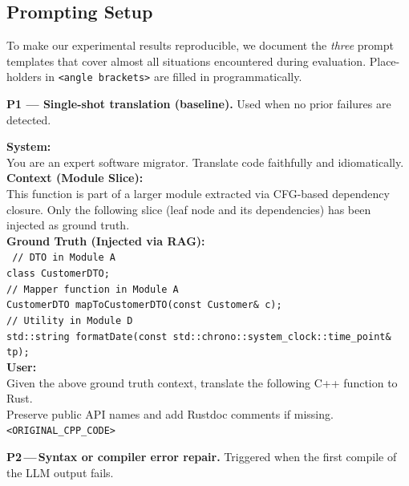 \documentclass[twocolumn]{article}
\begin{document}
    \subsection{Prompting Setup}
    \label{subsec:prompts}
    
    To make our experimental results reproducible, we document the
    \emph{three} prompt templates that cover almost all situations
    encountered during evaluation.  Place-holders in
    \texttt{\textless angle\,brackets\textgreater} are filled in
    programmatically.
    
    \noindent\textbf{P1 — Single-shot translation (baseline).}
    Used when no prior failures are detected.
    
    \begin{tcolorbox}
        \small
        \textbf{System:}\\
        You are an expert software migrator. Translate code faithfully and idiomatically.\\[4pt]
        \textbf{Context (Module Slice):}\\
        This function is part of a larger module extracted via CFG-based dependency closure. Only the following slice (leaf node and its dependencies) has been injected as ground truth.\\[4pt]
        \textbf{Ground Truth (Injected via RAG):}\\
    \texttt{%
    // DTO in Module A\\
    class CustomerDTO;\\[6pt]
    // Mapper function in Module A\\
    CustomerDTO mapToCustomerDTO(const Customer\& c);\\[6pt]
    // Utility in Module D\\
    std::string formatDate(const std::chrono::system\_clock::time\_point\& tp);%
    }\\[6pt]
        \textbf{User:}\\
        Given the above ground truth context, translate the following C++ function to Rust.\\
        Preserve public API names and add Rustdoc comments if missing.\\[6pt]
        \texttt{\textless ORIGINAL\_CPP\_CODE\textgreater}
    \end{tcolorbox}
    
    \noindent\textbf{P2\,---\,Syntax or compiler error repair.}
    Triggered when the first compile of the LLM output fails.
    
\end{document}
